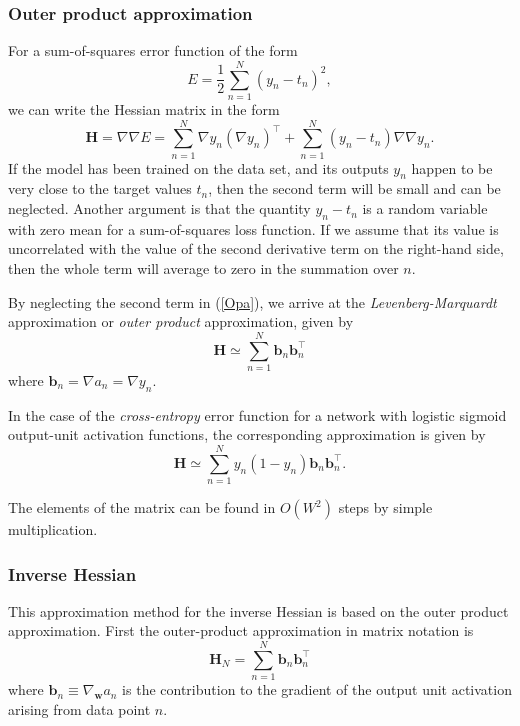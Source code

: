 \documentclass[a4paper]{report}
\renewcommand{\bf}{\mathbf}
\newcommand{\imp}[1]{{\color{blue}\textit{#1}}}
\begin{document}
\subsubsection{Outer product approximation}
For a sum-of-squares error function of the form
\begin{equation}
	E = \frac{1}{2} \sum_{n=1}^N (y_n-t_n)^2,
\end{equation}
we can write the Hessian matrix in the form
\begin{equation}
	\bf{H} = \nabla \nabla E = \sum_{n=1}^N \nabla y_n (\nabla y_n)^{\intercal} + \sum_{n=1}^N (y_n-t_n) \nabla\nabla y_n. \label{Opa}
\end{equation}
If the model has been trained on the data set, and its outputs $y_n$ happen to be very close to the target values $t_n$, then the second term will be small and can be neglected. Another argument is that the quantity $y_n-t_n$ is a random variable with zero mean for a sum-of-squares loss function. If we assume that its value is uncorrelated with the value of the second derivative term on the right-hand side, then the whole term will average to zero in the summation over $n$.

By neglecting the second term in (\ref{Opa}), we arrive at the \imp{Levenberg-Marquardt} approximation or \imp{outer product} approximation, given by
\begin{equation}
	\bf{H} \simeq \sum_{n=1}^N \bf{b}_n \bf{b}_n^{\intercal}
\end{equation}
where $\bf{b}_n = \nabla a_n = \nabla y_n$. 

In the case of the \emph{cross-entropy} error function for a network with logistic sigmoid output-unit activation functions, the corresponding approximation is given by
\begin{equation}
	\bf{H} \simeq \sum_{n=1}^N y_n (1-y_n) \bf{b}_n \bf{b}_n^{\intercal}.
\end{equation}

The elements of the matrix can be found in $O(W^2)$ steps by simple multiplication.
\subsubsection{Inverse Hessian}
This approximation method for the inverse Hessian is based on the outer product approximation. First the outer-product approximation in matrix notation is
\begin{equation}
	\bf{H}_N  = \sum_{n=1}^N \bf{b}_n \bf{b}_n^{\intercal}
\end{equation}
where $\bf{b}_n \equiv \nabla_{\bf{w}} a_n$ is the contribution to the gradient of the output unit activation arising from data point $n$. 
\end{document}
